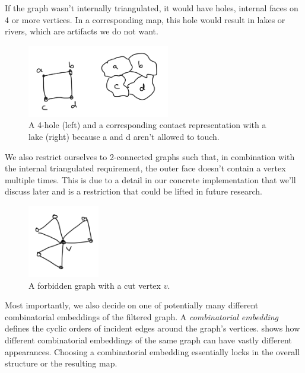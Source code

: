 If the graph wasn't internally triangulated, it would have holes, \ie{} internal faces on 4 or more vertices. In a corresponding map, this hole would result in lakes or rivers, which are artifacts we do not want.

\begin{figure}[H]
	\centering\includegraphics[height=120px]{Resources/Filtering-Hole.png}
	\caption{A 4-hole (left) and a corresponding contact representation with a lake (right) because a and d aren't allowed to touch.}
	\label{fig:filtering-holes}
\end{figure}

We also restrict ourselves to 2-connected graphs such that, in combination with the internal triangulated requirement, the outer face doesn't contain a vertex multiple times. This is due to a detail in our concrete implementation that we'll discuss later and is a restriction that could be lifted in future research.

\begin{figure}[H]
	\centering\includegraphics[height=120px]{Resources/Filtering-Connectedness.png} %
	\caption{A forbidden graph with a cut vertex $v$.}
	\label{fig:filtering-connectedness}
\end{figure}

Most importantly, we also decide on one of potentially many different combinatorial embeddings of the filtered graph. A \emph{combinatorial embedding} defines the cyclic orders of incident edges around the graph's vertices.  shows how different combinatorial embeddings of the same graph can have vastly different appearances. Choosing a  combinatorial embedding essentially locks in the overall structure or the resulting map.

